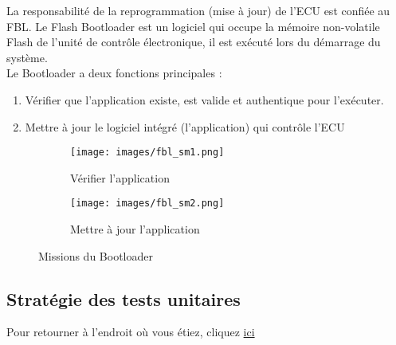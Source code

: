 \documentclass[a4paper, 12pt]{report}
\begin{document}
La responsabilité de la reprogrammation (mise à jour) de l'ECU est confiée au FBL. Le Flash Bootloader est un logiciel qui occupe la mémoire non-volatile Flash de l'unité de contrôle électronique, il est exécuté lors du démarrage du système.
\\
Le Bootloader a deux fonctions principales :
\begin{enumerate}
    \item Vérifier que l'application existe, est valide et authentique pour l'exécuter.

    \item Mettre à jour le logiciel intégré (l'application) qui contrôle l'ECU 
\end{enumerate}
        \begin{figure}[H]
             \centering
             \begin{subfigure}[t]{0.49\textwidth}
                 \centering
                 \texttt{[image: images/fbl\_sm1.png]}
                 \caption{Vérifier l'application}
                 \label{filtre8}
             \end{subfigure}
             \hfill
             \begin{subfigure}[t]{0.49\textwidth}
             \centering
             \texttt{[image: images/fbl\_sm2.png]}
             \caption{Mettre à jour l'application}
            \label{filtre7}
             \end{subfigure}
             \centering
             \caption{Missions du  Bootloader}
                \label{filtres}
         \end{figure}





\subsection{Stratégie des tests unitaires}\label{subsec:ut}
Pour retourner à l'endroit où vous étiez, cliquez \hyperref[sec:Méthode]{ici}\\
\end{document}
